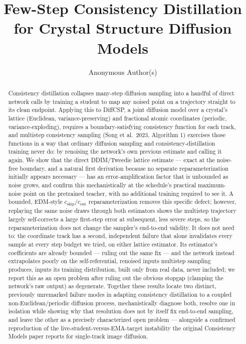 \documentclass{article}
\title{Few-Step Consistency Distillation for Crystal Structure Diffusion Models}
\author[Anonymous]{Anonymous Author(s)}
\begin{document}
\maketitle

\begin{abstract}
Consistency distillation collapses many-step diffusion sampling into a handful of direct network calls by training a student to map any noised point on a trajectory straight to its clean endpoint. Applying this to DiffCSP, a joint diffusion model over a crystal's lattice (Euclidean, variance-preserving) and fractional atomic coordinates (periodic, variance-exploding), requires a boundary-satisfying consistency function for each track, and multistep consistency sampling (Song et al.\ 2023, Algorithm 1) exercises those functions in a way that ordinary diffusion sampling and consistency-distillation training never do: by renoising the network's own previous estimate and calling it again. We show that the direct DDIM/Tweedie lattice estimate --- exact at the noise-free boundary, and a natural first derivation because no separate reparameterization initially appears necessary --- has an error-amplification factor that is unbounded as noise grows, and confirm this mechanistically at the schedule's practical maximum-noise point on the pretrained teacher, with no additional training required to see it. A bounded, EDM-style $c_{\text{skip}}/c_{\text{out}}$ reparameterization removes this specific defect; however, replaying the same noise draws through both estimators shows the multistep trajectory largely self-corrects a large first-step error at subsequent, less severe steps, so the reparameterization does not change the sampler's end-to-end validity. It does not need to: the coordinate track has a second, independent failure that alone invalidates every sample at every step budget we tried, on either lattice estimator. Its estimator's coefficients are already bounded --- ruling out the same fix --- and the network instead extrapolates poorly on the self-referential, renoised inputs multistep sampling produces, inputs its training distribution, built only from real data, never included; we report this as an open problem after ruling out the obvious stopgap (clamping the network's raw output) as degenerate. Together these results locate two distinct, previously unremarked failure modes in adapting consistency distillation to a coupled non-Euclidean/periodic diffusion process, mechanistically diagnose both, resolve one in isolation while showing why that resolution does not by itself fix end-to-end sampling, and leave the other as a precisely characterized open problem --- alongside a confirmed reproduction of the live-student-versus-EMA-target instability the original Consistency Models paper reports for single-track image diffusion.
\end{abstract}
\end{document}

